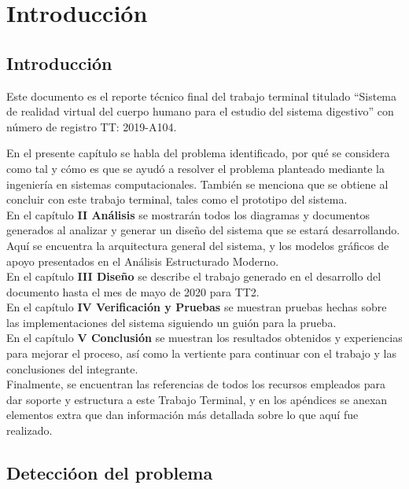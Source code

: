 \chapter{Introducción}

\section{Introducción}
Este documento es el reporte técnico final del trabajo terminal titulado “Sistema de realidad virtual del cuerpo humano para el estudio del sistema digestivo” con número de registro TT: 2019-A104.

En el presente capítulo se habla del problema identificado, por qué se considera como tal y cómo es que se ayudó a resolver el problema planteado mediante la ingeniería en sistemas computacionales. También se menciona que se obtiene al concluir con este trabajo terminal, tales como el prototipo del sistema.\\
\newline
En el capítulo \textbf{II Análisis} se mostrarán todos los diagramas y documentos generados al analizar y generar un diseño del sistema que se estará desarrollando. Aquí se encuentra la arquitectura general del sistema, y los modelos gráficos de apoyo presentados en el Análisis Estructurado Moderno.\\
\newline
En el capítulo \textbf{III Diseño} se describe el trabajo generado en el desarrollo del documento hasta el mes de mayo de 2020 para TT2.\\
\newline
En el capítulo \textbf{IV Verificación y Pruebas} se muestran pruebas hechas sobre las implementaciones del sistema siguiendo un guión para la prueba.
 \newline\\
En el capítulo \textbf{V Conclusión} se muestran los resultados obtenidos y experiencias para mejorar el proceso, así como la vertiente para continuar con el trabajo y las conclusiones del integrante.
\newline\\
Finalmente, se encuentran las referencias de todos los recursos empleados para dar soporte y estructura a este Trabajo Terminal, y en los apéndices se anexan elementos extra que dan información más detallada sobre lo que aquí fue realizado.\\
\vfill 

\newpage

\section{Detecci\'oon del problema} 

